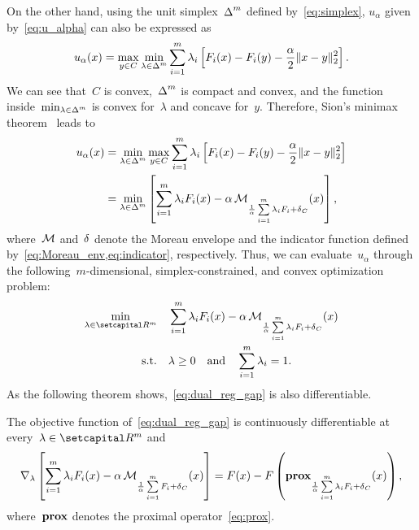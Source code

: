 \documentclass[../../main]{subfiles}
\begin{document}
On the other hand, using the unit simplex~$\operatorname{\Delta}^m$ defined by~\cref{eq:simplex}, $u_\alpha$ given by~\cref{eq:u_alpha} can also be expressed as
\[
    u_\alpha(x) = \max_{y \in C} \min_{\lambda \in \operatorname{\Delta}^m} \sum_{i = 1}^{m} \lambda_i \left[ F_i(x) - F_i(y) - \frac{\alpha}{2} \lVert x - y\rVert_2^2 \right] 
.\] 
We can see that~$C$ is convex,~$\operatorname{\Delta}^m$ is compact and convex, and the function inside~$\min_{\lambda \in \operatorname{\Delta}^m}$ is convex for~$\lambda$ and concave for~$y$.
Therefore, Sion's minimax theorem~\cite{Sion1958} leads to
\begin{equation} \label{eq:u dual}
    \begin{split}
        u_\alpha(x) &= \min_{\lambda \in \operatorname{\Delta}^m} \max_{y \in C} \sum_{i = 1}^{m} \lambda_i \left[ F_i(x) - F_i(y) - \frac{\alpha}{2} \lVert x - y\rVert_2^2 \right] \\
                  &= \min_{\lambda \in \operatorname{\Delta}^m} \left[ \sum_{i = 1}^{m} \lambda_i F_i(x) - \alpha \operatorname{\mathcal{M}}_{\frac{1}{\alpha} \sum\limits_{i = 1}^{m} \lambda_i F_i + \operatorname{\delta}_C} (x) \right]
    ,\end{split}
\end{equation}
where~$\operatorname{\mathcal{M}}$ and~$\operatorname{\delta}$ denote the Moreau envelope and the indicator function defined by~\cref{eq:Moreau_env,eq:indicator}, respectively.
Thus, we can evaluate~$u_\alpha$ through the following~$m$-dimensional, simplex-constrained, and convex optimization problem:
\begin{equation} \label{eq:dual_reg_gap}
    \begin{aligned}
        \min_{\lambda \in \setR^m} &&& \sum_{i = 1}^{m} \lambda_i F_i(x) - \alpha \envelope_{\frac{1}{\alpha} \sum\limits_{i = 1}^{m} \lambda_i F_i + \indicator_C}(x) \\
        \st &&& \lambda \ge 0 \eqand \sum_{i = 1}^{m} \lambda_i = 1 
    .\end{aligned}
\end{equation} 
As the following theorem shows,~\cref{eq:dual_reg_gap} is also differentiable.
\begin{theorem} \label{thm:dual_reg_gap_smooth}
    The objective function of~\cref{eq:dual_reg_gap} is continuously differentiable at every~$\lambda \in \setR^m$ and
    \[
        \nabla_\lambda \left[ \sum_{i = 1}^{m} \lambda_i F_i(x) - \alpha \operatorname{\mathcal{M}}_{\frac{1}{\alpha} \sum\limits_{i = 1}^{m} F_i + \operatorname{\delta}_C}(x) \right] = F(x) - F\left( \operatorname{\mathbf{prox}}_{\frac{1}{\alpha} \sum\limits_{i = 1}^{m} \lambda_i F_i + \operatorname{\delta}_C}(x) \right)
    ,\] 
    where~$\operatorname{\mathbf{prox}}$ denotes the proximal operator~\cref{eq:prox}.
\end{theorem}
\end{document}
